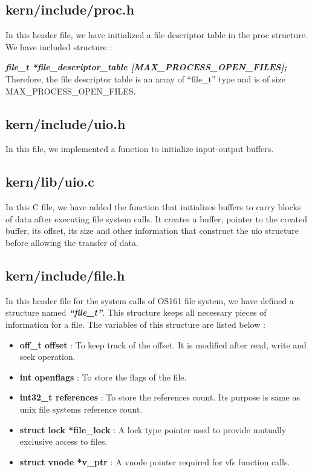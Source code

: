 \documentclass[a4paper]{article}
\begin{document}
\subsection{kern/include/proc.h}
In this header file, we have initialized a file descriptor table in the proc structure. We have included structure :

\textbf{\textit{file\_t *file\_descriptor\_table [MAX\_PROCESS\_OPEN\_FILES];}}\\Therefore, the file descriptor table is an array of ``file\_t” type and is of size MAX\_PROCESS\_OPEN\_FILES.

\subsection{kern/include/uio.h}
In this file, we implemented a function to initialize input-output buffers.

\subsection{kern/lib/uio.c}
In this C file, we have added the function that initializes buffers to carry blocks of data after executing file system calls. It creates a buffer, pointer to the created buffer, its offset, its size and other information that construct the uio structure before allowing the transfer of data.


\subsection{kern/include/file.h}
In this header file for the system calls of OS161 file system, we have defined a structure named \textbf{\textit{``file\_t”}}. This structure keeps all necessary pieces of information for a file. The variables of this structure are listed below :

\begin{itemize}
	\item \textbf{off\_t offset} : To keep track of the offset. It is modified after read, write and seek operation.
	\item \textbf{int openflags} : To store the flags of the file.
	\item \textbf{int32\_t references} : To store the references count. Its purpose is same as unix file systems reference count.
	\item \textbf{struct lock *file\_lock} : A lock type pointer used to provide mutually exclusive access to files.
	\item \textbf{struct vnode *v\_ptr} : A vnode pointer required for vfs function calls.
\end{itemize}
\end{document}
